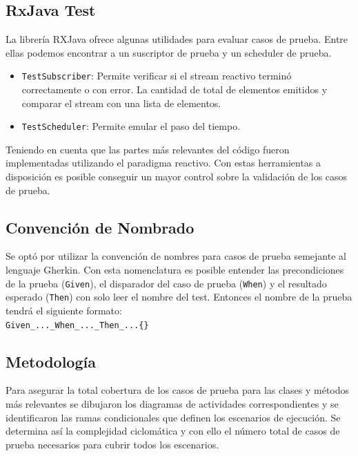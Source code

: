 \subsection{RxJava Test}
La librería RXJava ofrece algunas utilidades para evaluar casos de prueba. Entre ellas podemos encontrar a un suscriptor de prueba y un scheduler de prueba.
\begin{itemize}
	\item \texttt{TestSubscriber}: Permite verificar si el stream reactivo terminó correctamente o con error. La cantidad de total de elementos emitidos y comparar el stream con una lista de elementos. 
	\item \texttt{TestScheduler}: Permite emular el paso del tiempo. 
\end{itemize}
Teniendo en cuenta que las partes más relevantes del código fueron implementadas utilizando el paradigma reactivo. Con estas herramientas a disposición es posible conseguir un mayor control sobre la validación de los casos de prueba.

\subsection{Convención de Nombrado}
Se optó por utilizar la convención de nombres para casos de prueba semejante al lenguaje Gherkin. Con esta nomenclatura es posible entender las precondiciones de la prueba (\texttt{Given}), el disparador del caso de prueba (\texttt{When}) y el resultado esperado (\texttt{Then}) con solo leer el nombre del test.
Entonces el nombre de la prueba tendrá el siguiente formato:\\
\texttt{Given\_...\_When\_...\_Then\_...\{\}}

\subsection{Metodología}
Para asegurar la total cobertura de los casos de prueba para las clases y métodos más relevantes se dibujaron los diagramas de actividades correspondientes y se identificaron las ramas condicionales que definen los escenarios de ejecución. Se determina así la complejidad ciclomática y con ello el número total de casos de prueba necesarios para cubrir todos los escenarios.

